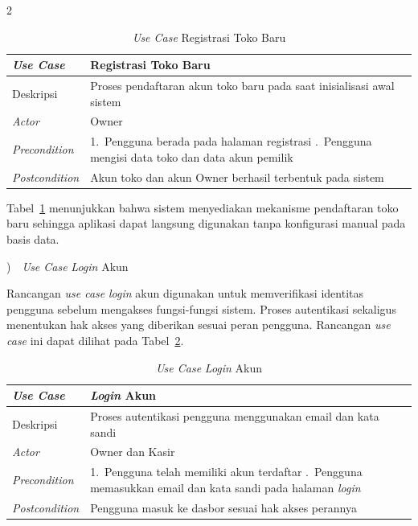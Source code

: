 \documentclass[12pt, a4paper, onecolumn, oneside]{report}
\begin{document}
\begin{spacing}{2}
\begin{table}[H]
\centering
\caption{\textit{Use Case} Registrasi Toko Baru}
\label{tab:uc-registrasi}
\begin{tabularx}{\textwidth}{|p{3.2cm}|X|}
\hline
\textbf{\textit{Use Case}} & \textbf{Registrasi Toko Baru} \\ \hline
Deskripsi & Proses pendaftaran akun toko baru pada saat inisialisasi awal sistem \\ \hline
\textit{Actor} & Owner \\ \hline
\textit{Precondition} & 1.~Pengguna berada pada halaman registrasi \newline 2.~Pengguna mengisi data toko dan data akun pemilik \\ \hline
\textit{Postcondition} & Akun toko dan akun Owner berhasil terbentuk pada sistem \\ \hline
\end{tabularx}
\end{table}

Tabel~\ref{tab:uc-registrasi} menunjukkan bahwa sistem menyediakan mekanisme pendaftaran toko baru sehingga aplikasi dapat langsung digunakan tanpa konfigurasi manual pada basis data.

)~~\textit{Use Case} \textit{Login} Akun

Rancangan \textit{use case} \textit{login} akun digunakan untuk memverifikasi identitas pengguna sebelum mengakses fungsi-fungsi sistem. Proses autentikasi sekaligus menentukan hak akses yang diberikan sesuai peran pengguna. Rancangan \textit{use case} ini dapat dilihat pada Tabel~\ref{tab:uc-login}.

\begin{table}[H]
\centering
\caption{\textit{Use Case} \textit{Login} Akun}
\label{tab:uc-login}
\begin{tabularx}{\textwidth}{|p{3.2cm}|X|}
\hline
\textbf{\textit{Use Case}} & \textbf{\textit{Login} Akun} \\ \hline
Deskripsi & Proses autentikasi pengguna menggunakan email dan kata sandi \\ \hline
\textit{Actor} & Owner dan Kasir \\ \hline
\textit{Precondition} & 1.~Pengguna telah memiliki akun terdaftar \newline 2.~Pengguna memasukkan email dan kata sandi pada halaman \textit{login} \\ \hline
\textit{Postcondition} & Pengguna masuk ke dasbor sesuai hak akses perannya \\ \hline
\end{tabularx}
\end{table}


\end{spacing}
\end{document}
